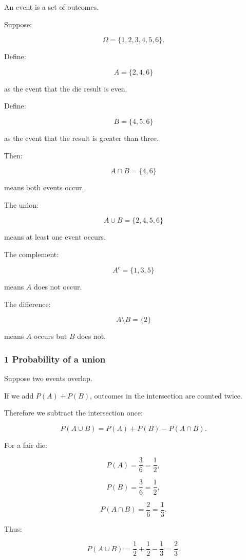 \hypertarget{02-foundations-ii-ch023-events-and-set-operations}{}

An event is a set of outcomes.

Suppose:

\[
 \Omega=\{1,2,3,4,5,6\}.
\]

Define:

\[
 A=\{2,4,6\}
\]

as the event that the die result is even.

Define:

\[
 B=\{4,5,6\}
\]

as the event that the result is greater than three.

Then:

\[
 A\cap B=\{4,6\}
\]

means both events occur.

The union:

\[
 A\cup B=\{2,4,5,6\}
\]

means at least one event occurs.

The complement:

\[
 A^c=\{1,3,5\}
\]

means \(A\) does not occur.

The difference:

\[
 A\setminus B=\{2\}
\]

means \(A\) occurs but \(B\) does not.

\subsubsection{1 Probability of a union}\label{02-foundations-ii-ch023-probability-of-a-union}

\hypertarget{02-foundations-ii-ch023-probability-of-a-union}{}

Suppose two events overlap.

If we add \(P(A)+P(B)\), outcomes in the intersection are counted twice.

Therefore we subtract the intersection once:

\[
 \boxed{ P(A\cup B) = P(A)+P(B)-P(A\cap B) }.
\]

For a fair die:

\[
 P(A)=\frac36=\frac12,
\]

\[
 P(B)=\frac36=\frac12,
\]

\[
 P(A\cap B)=\frac26=\frac13.
\]

Thus:

\[
 P(A\cup B) = \frac12+\frac12-\frac13 =\boxed{\frac23}.
\]

